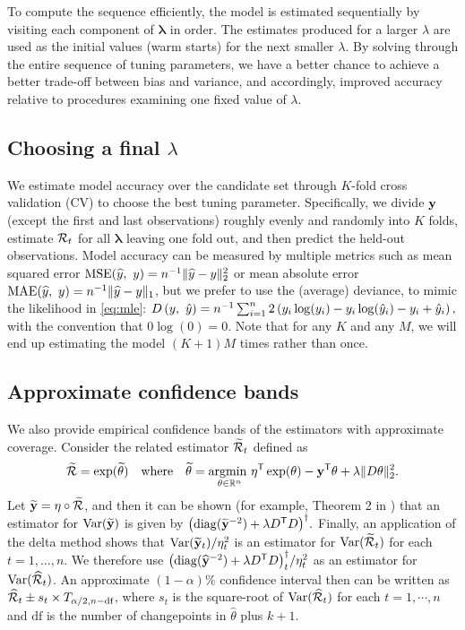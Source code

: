 To compute the sequence efficiently, the model is estimated sequentially by
visiting each component of $\boldsymbol{\lambda}$ in order. The estimates
produced for a larger $\lambda$ are used as the initial values (warm starts) for
the next smaller $\lambda$. By solving through the entire sequence of tuning
parameters, we have a better chance to achieve a better trade-off between bias
and variance, and accordingly, improved accuracy relative to procedures
examining one fixed value of $\lambda$.


\subsection{Choosing a final $\lambda$}
\label{sec:cv}

We estimate model accuracy over the candidate set through $K$-fold cross
validation (CV) to choose the best tuning parameter. Specifically, we divide
$\mathbf{y}$ (except the first and last observations) roughly evenly and randomly into
$K$ folds, estimate $\mathcal{R}_t$ for all $\boldsymbol{\lambda}$ leaving one fold
out, and then predict the held-out observations. Model accuracy can be measured
by multiple metrics such as mean squared error $\mathrm{MSE}(\widehat{y},\ y) =
n^{-1}\lVert \widehat{y} - y \rVert_2^2$ or mean absolute error
$\mathrm{MAE}(\widehat{y},\ y) = n^{-1}\lVert \widehat{y} - y \rVert_1$, but we prefer
to use the (average) deviance, to mimic the likelihood in \eqref{eq:mle}:
$D\left(y,\ \hat{y}\right) = n^{-1}\sum_{i=1}^n 2\left(y_i \log(y_i) - y_i\log(\hat{y}_i)
- y_i + \hat{y}_i\right),$ with the convention that $0\log(0) = 0$. Note that for any $K$ and any $M$, we will end up 
estimating the model $(K+1)M$ times rather than once.


\subsection{Approximate confidence bands} 
\label{sec:conf-band} 

We also provide empirical confidence bands of the estimators with  
approximate coverage. Consider the related estimator $\widetilde{\mathcal{R}}_t$
defined as
$$\widetilde{\mathcal{R}} = \exp(\widetilde{\theta}) \quad\textrm{where}\quad
\widetilde{\theta} = \underset{\theta\in\mathbb{R}^n}{\operatorname*{argmin}\ } \eta^{\mathsf{T}} \exp(\theta) - \mathbf{y}^{\mathsf{T}}
\theta + \lambda \lVert D \theta \rVert_2^2.$$ 
Let $\widetilde{\mathbf{y}} = \eta \circ \widetilde{\mathcal{R}}$, and then it can be shown (for example,
Theorem 2 in \cite{vaiter2017degrees}) that an estimator for
$\mathrm{Var}(\widetilde{\mathbf{y}})$ is given by $\big(\mathrm{diag}(\widetilde{\mathbf{y}}^{-2})
+ \lambda D^{\mathsf{T}} D\big)^{\dagger}.$ Finally, an
application of the delta method shows that $\mathrm{Var}(\widetilde{\mathbf{y}}_t) / \eta_t^2$
is an estimator for $\mathrm{Var}(\widetilde{\mathcal{R}}_t)$ for each $t = 1, \ldots, n$. We
therefore use ${\big(\mathrm{diag}(\widehat{\mathbf{y}}^{-2}) + \lambda
D^{\mathsf{T}} D\big)}^{\dagger}_t / \eta_t^2$ as an estimator
for $\mathrm{Var}(\widehat{\mathcal{R}}_t)$. An approximate $(1-\alpha)\%$ confidence interval
then can be written as $\widehat{\mathcal{R}}_t\pm s_t \times T_{\alpha/2,n-\textrm{df}}$, 
where $s_t$ is the square-root of $\mathrm{Var}(\widehat{\mathcal{R}}_t)$ for each 
$t = 1, \cdots, n$ and $\textrm{df}$ is the number of changepoints in 
$\widehat{\theta}$ plus $k+1$. 


